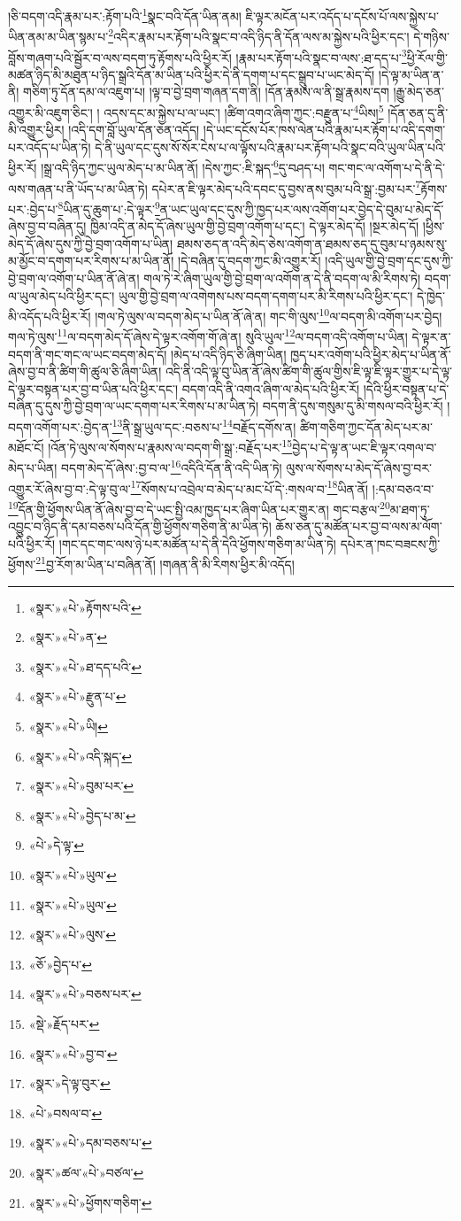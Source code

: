 །ཅི་བདག་འདི་རྣམ་པར་:རྟོག་པའི་\footnote{«སྣར་»«པེ་»རྟོགས་པའི་}སྣང་བའི་དོན་ཡིན་ནམ། ཇི་ལྟར་མངོན་པར་འདོད་པ་དངོས་པོ་ལས་སྐྱེས་པ་ཡིན་ནམ་མ་ཡིན་སྙམ་པ་\footnote{«སྣར་»«པེ་»ན་}འདིར་རྣམ་པར་རྟོག་པའི་སྣང་བ་འདི་ཉིད་ནི་དོན་ལས་མ་སྐྱེས་པའི་ཕྱིར་དང་། དེ་གཉིས་བློས་གཞག་པའི་སྦྱོར་བ་ལས་བདག་ཏུ་རྟོགས་པའི་ཕྱིར་རོ། །རྣམ་པར་རྟོག་པའི་སྣང་བ་ལས་:ཐ་དད་པ་\footnote{«སྣར་»«པེ་»ཐ་དད་པའི་}ཕྱི་རོལ་གྱི་མཚན་ཉིད་མི་མཐུན་པ་ཉིད་སྒྲའི་དོན་མ་ཡིན་པའི་ཕྱིར་དེ་ནི་དགག་པ་དང་སྒྲུབ་པ་ཡང་མེད་དོ། །དེ་ལྟ་མ་ཡིན་ན་ནི། གཅིག་ཏུ་དོན་དམ་ལ་འཇུག་པ། །ལྟ་བ་བྱེ་བྲག་གཞན་དག་ནི། །དོན་རྣམས་ལ་ནི་སྒྲ་རྣམས་དག །རྒྱུ་མེད་ཅན་འགྱུར་མི་འཇུག་ཅིང་། །
འདས་དང་མ་སྐྱེས་པ་ལ་ཡང་། །ཚིག་འགའ་ཞིག་ཀྱང་:བརྫུན་པ་\footnote{«སྣར་»«པེ་»རྫུན་པ་}ཡིས།\footnote{«སྣར་»«པེ་»ཡི།} །དོན་ཅན་དུ་ནི་མི་འགྱུར་ཕྱིར། །འདི་དག་བློ་ཡུལ་དོན་ཅན་འདོད། །དེ་ཡང་དངོས་པོར་ཁས་ལེན་པའི་རྣམ་པར་རྟོག་པ་འདི་དགག་པར་འདོད་པ་ཡིན་ཏེ། དེ་ནི་ཡུལ་དང་དུས་སོ་སོར་ངེས་པ་ལ་ལྟོས་པའི་རྣམ་པར་རྟོག་པའི་སྣང་བའི་ཡུལ་ཡིན་པའི་ཕྱིར་རོ། །སྒྲ་འདི་ཉིད་ཀྱང་ཡུལ་མེད་པ་མ་ཡིན་ནོ། །དེས་ཀྱང་:ཇི་སྐད་\footnote{«སྣར་»«པེ་»འདི་སྐད་}དུ་བཤད་པ། གང་གང་ལ་འགོག་པ་དེ་ནི་དེ་ལས་གཞན་པ་ནི་ཡོད་པ་མ་ཡིན་ཏེ། དཔེར་ན་ཇི་ལྟར་མེད་པའི་དབང་དུ་བྱས་ནས་བུམ་པའི་སྒྲ་:བྱམ་པར་\footnote{«སྣར་»«པེ་»བུམ་པར་}རྟོགས་པར་:བྱེད་པ་\footnote{«སྣར་»«པེ་»བྱེད་པ་མ་}ཡིན་དུ་ཆུག་པ་:དེ་ལྟར་\footnote{«པེ་»དེ་ལྟ་}ན་ཡང་ཡུལ་དང་དུས་ཀྱི་ཁྱད་པར་ལས་འགོག་པར་བྱེད་དེ་བུམ་པ་མེད་དོ་ཞེས་བྱ་བ་བཞིན་དུ། ཁྱིམ་འདི་ན་མེད་དོ་ཞེས་ཡུལ་གྱི་བྱེ་བྲག་འགོག་པ་དང་། དེ་ལྟར་མེད་དོ། །སྔར་མེད་དོ། །ཕྱིས་མེད་དོ་ཞེས་དུས་ཀྱི་བྱེ་བྲག་འགོག་པ་ཡིན། ཐམས་ཅད་ན་འདི་མེད་ཅེས་འགོག་ན་ཐམས་ཅད་དུ་བུམ་པ་ཉམས་སུ་མ་མྱོང་བ་དགག་པར་རིགས་པ་མ་ཡིན་ནོ། །དེ་བཞིན་དུ་བདག་ཀྱང་མི་འགྱུར་རོ། །འདི་ཡུལ་གྱི་བྱེ་བྲག་དང་དུས་ཀྱི་བྱེ་བྲག་ལ་འགོག་པ་ཡིན་ནོ་ཞེ་ན། གལ་ཏེ་རེ་ཞིག་ཡུལ་གྱི་བྱེ་བྲག་ལ་འགོག་ན་དེ་ནི་བདག་ལ་མི་རིགས་ཏེ། བདག་ལ་ཡུལ་མེད་པའི་ཕྱིར་དང་། ཡུལ་གྱི་བྱེ་བྲག་ལ་འགེགས་པས་བདག་དགག་པར་མི་རིགས་པའི་ཕྱིར་དང་། དེ་ཁྱེད་མི་འདོད་པའི་ཕྱིར་རོ། །གལ་ཏེ་ལུས་ལ་བདག་མེད་པ་ཡིན་ནོ་ཞེ་ན། གང་གི་ལུས་\footnote{«སྣར་»«པེ་»ཡུལ་}ལ་བདག་མི་འགོག་པར་བྱེད། གལ་ཏེ་ལུས་\footnote{«སྣར་»«པེ་»ཡུལ་}ལ་བདག་མེད་དོ་ཞེས་དེ་ལྟར་འགོག་གོ་ཞེ་ན། སུའི་ཡུལ་\footnote{«སྣར་»«པེ་»ལུས་}ལ་བདག་འདི་འགོག་པ་ཡིན། དེ་ལྟར་ན་བདག་ནི་གང་གང་ལ་ཡང་བདག་མེད་དོ། །མེད་པ་འདི་ཉིད་ཅི་ཞིག་ཡིན། ཁྱད་པར་འགོག་པའི་ཕྱིར་མེད་པ་ཡིན་ནོ་ཞེས་བྱ་བ་ནི་ཚིག་གི་ཚུལ་ཅི་ཞིག་ཡིན། འདི་ནི་འདི་ལྟ་བུ་ཡིན་ནོ་ཞེས་ཚིག་གི་ཚུལ་གྱིས་ཇི་ལྟ་ཇི་ལྟར་གྱུར་པ་དེ་ལྟ་དེ་ལྟར་བསྟན་པར་བྱ་བ་ཡིན་པའི་ཕྱིར་དང་། བདག་འདི་ནི་འགའ་ཞིག་ལ་མེད་པའི་ཕྱིར་རོ། །དེའི་ཕྱིར་བསྟན་པ་དེ་བཞིན་དུ་དུས་ཀྱི་བྱེ་བྲག་ལ་ཡང་དགག་པར་རིགས་པ་མ་ཡིན་ཏེ། བདག་ནི་དུས་གསུམ་དུ་མི་གསལ་བའི་ཕྱིར་རོ། །བདག་འགོག་པར་:བྱེད་ན་\footnote{«ཅོ་»བྱེད་པ་}ནི་སྒྲ་ཡུལ་དང་:བཅས་པ་\footnote{«སྣར་»«པེ་»བཅས་པར་}བརྗོད་དགོས་ན། ཚིག་གཅིག་ཀྱང་དོན་མེད་པར་མ་མཐོང་ངོ། །འོན་ཏེ་ལུས་ལ་སོགས་པ་རྣམས་ལ་བདག་གི་སྒྲ་:བརྗོད་པར་\footnote{«སྡེ་»རྗོད་པར་}བྱེད་པ་དེ་ལྟ་ན་ཡང་ཇི་ལྟར་འགལ་བ་མེད་པ་ཡིན། བདག་མེད་དོ་ཞེས་:བྱ་བ་ལ་\footnote{«སྣར་»«པེ་»བྱ་བ་}འདིའི་དོན་ནི་འདི་ཡིན་ཏེ། ལུས་ལ་སོགས་པ་མེད་དོ་ཞེས་བྱ་བར་འགྱུར་རོ་ཞེས་བྱ་བ་:དེ་ལྟ་བུ་ལ་\footnote{«སྣར་»དེ་ལྟ་བུར་}སོགས་པ་འབྲེལ་བ་མེད་པ་མང་པོ་དེ་:གསལ་བ་\footnote{«པེ་»བསལ་བ་}ཡིན་ནོ། །:དམ་བཅའ་བ་\footnote{«སྣར་»«པེ་»དམ་བཅས་པ་}དོན་གྱི་ཕྱོགས་ཡིན་ནོ་ཞེས་བྱ་བ་དེ་ཡང་སྤྱི་འམ་ཁྱད་པར་ཞིག་ཡིན་པར་གྱུར་ན། གང་བརྩལ་\footnote{«སྣར་»ཚལ་«པེ་»བཙལ་}མ་ཐག་ཏུ་འབྱུང་བ་ཉིད་ནི་དམ་བཅས་པའི་དོན་གྱི་ཕྱོགས་གཅིག་ནི་མ་ཡིན་ཏེ། ཆོས་ཅན་དུ་མཚོན་པར་བྱ་བ་ལས་མ་ལོག་པའི་ཕྱིར་རོ། །གང་དང་གང་ལས་ཉེ་པར་མཚོན་པ་དེ་ནི་དེའི་ཕྱོགས་གཅིག་མ་ཡིན་ཏེ། དཔེར་ན་ཁང་བཟངས་ཀྱི་ཕྱོགས་\footnote{«སྣར་»«པེ་»ཕྱོགས་གཅིག་}བྱ་རོག་མ་ཡིན་པ་བཞིན་ནོ། །གཞན་ནི་མི་རིགས་ཕྱིར་མི་འདོད། 